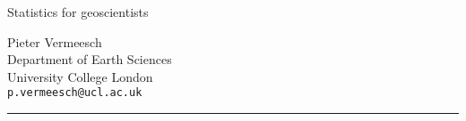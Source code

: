 \documentclass[11pt]{book}
\begin{document}
\begin{titlepage}
  
  \parbox[t]{0.93\textwidth}{
    \parbox[t]{0.91\textwidth}{
      \raggedleft
      \fontsize{50pt}{80pt}
      \vspace{0.7cm}
      \Huge
      Statistics for geoscientists\\
      
      \vspace{0.7cm}
    }
  }
  
  \vfill	
  \parbox[t]{0.93\textwidth}{
    \raggedleft
    \large
        {\Large Pieter Vermeesch}\\[4pt]
        Department of Earth Sciences\\
        University College London\\[4pt]
        \texttt{p.vermeesch@ucl.ac.uk}\\
	
        \hfill\rule{0.2\linewidth}{1pt}
}
	
\end{titlepage}

\tableofcontents






































\end{document}
